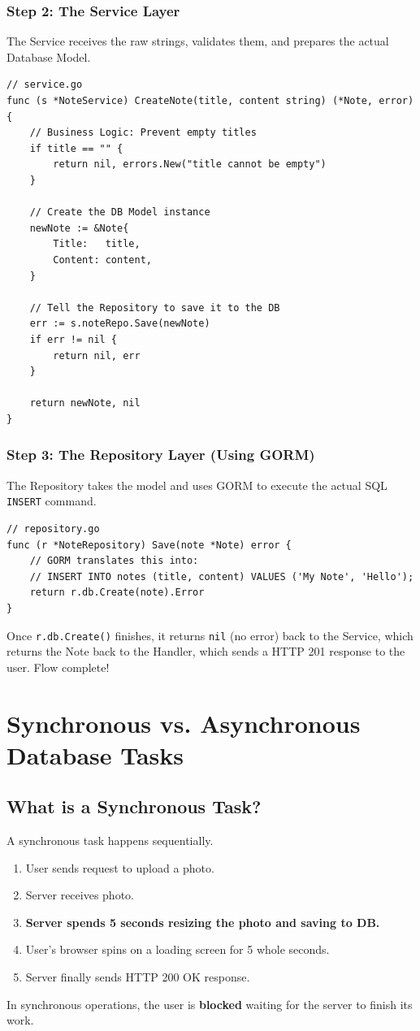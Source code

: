 \documentclass[11pt,a4paper]{article}
\begin{document}
\subsubsection{Step 2: The Service Layer}
The Service receives the raw strings, validates them, and prepares the actual Database Model.
\begin{lstlisting}
// service.go
func (s *NoteService) CreateNote(title, content string) (*Note, error) {
    // Business Logic: Prevent empty titles
    if title == "" {
        return nil, errors.New("title cannot be empty")
    }

    // Create the DB Model instance
    newNote := &Note{
        Title:   title,
        Content: content,
    }

    // Tell the Repository to save it to the DB
    err := s.noteRepo.Save(newNote)
    if err != nil {
        return nil, err
    }

    return newNote, nil
}
\end{lstlisting}

\subsubsection{Step 3: The Repository Layer (Using GORM)}
The Repository takes the model and uses GORM to execute the actual SQL \texttt{INSERT} command.
\begin{lstlisting}
// repository.go
func (r *NoteRepository) Save(note *Note) error {
    // GORM translates this into:
    // INSERT INTO notes (title, content) VALUES ('My Note', 'Hello');
    return r.db.Create(note).Error
}
\end{lstlisting}
Once \texttt{r.db.Create()} finishes, it returns \texttt{nil} (no error) back to the Service, which returns the Note back to the Handler, which sends a HTTP 201 response to the user. Flow complete!

\section{Synchronous vs. Asynchronous Database Tasks}
\subsection{What is a Synchronous Task?}
A synchronous task happens sequentially. 
\begin{enumerate}
    \item User sends request to upload a photo.
    \item Server receives photo.
    \item \textbf{Server spends 5 seconds resizing the photo and saving to DB.}
    \item User's browser spins on a loading screen for 5 whole seconds.
    \item Server finally sends HTTP 200 OK response.
\end{enumerate}
In synchronous operations, the user is \textbf{blocked} waiting for the server to finish its work.
\end{document}

